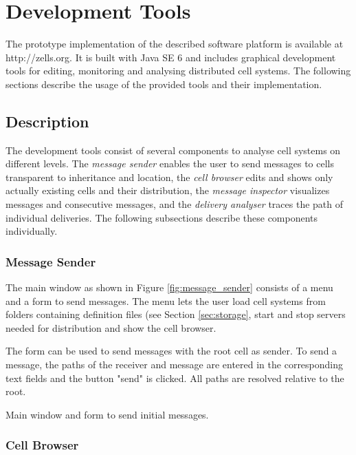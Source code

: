 
\graphicspath{{figures/graphical_interface/}}

\chapter{Development Tools}
\label{chap:graphical_interface}

\sloppy
The prototype implementation of the described software platform is available at http://zells.org. It is built with Java SE 6 and includes graphical development tools for editing, monitoring and analysing distributed cell systems. The following sections describe the usage of the provided tools and their implementation.

\section{Description}

\fussy
The development tools consist of several components to analyse cell systems on different levels. The \textit{message sender} enables the user to send messages to cells transparent to inheritance and location, the \textit{cell browser} edits and shows only actually existing cells and their distribution, the \textit{message inspector} visualizes messages and consecutive messages, and the \textit{delivery analyser} traces the path of individual deliveries. The following subsections describe these components individually.

\subsection{Message Sender}

The main window as shown in Figure \ref{fig:message_sender} consists of a menu and a form to send messages. The menu lets the user load cell systems from folders containing definition files (see Section \ref{sec:storage}, start and stop servers needed for distribution and show the cell browser.

The form can be used to send messages with the root cell as sender. To send a message, the paths of the receiver and message are entered in the corresponding text fields and the button "send" is clicked. All paths are resolved relative to the root.

{Main window and form to send initial messages.}

\subsection{Cell Browser}

